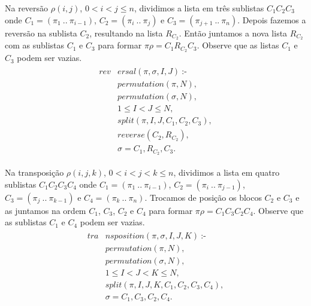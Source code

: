 Na reversão $\rho(i,j)$, $0 < i < j \leq n$, dividimos a lista em três
sublistas $C_{1}C_{2}C_{3}$ onde $C_{1} = (\pi_{1}~..~\pi_{i-1})$,
$C_{2} = (\pi_{i}~..~\pi_{j})$ e $C_{3} = (\pi_{j+1}~..~\pi_{n})$.
Depois fazemos a reversão na sublista $C_{2}$, resultando na lista
$R_{C_{2}}$. Então juntamos a nova lista $R_{C_{2}}$ com as sublistas
$C_{1}$ e $C_{3}$ para formar $\pi\rho = C_{1}R_{C_{2}}C_{3}$. Observe
que as listas $C_{1}$ e $C_{3}$ podem ser vazias.
\begin{align}
  \label{reversal}
  \begin{split}
  \textit{rev}&\textit{ersal}(\pi, \sigma, I, J)~\text{:-} \\
  &\textit{permutation}(\pi, N), \\
  &\textit{permutation}(\sigma, N),  \\
  &1 \le I < J \le N, \\
  &\textit{split}(\pi, I, J, C_{1}, C_{2}, C_{3}), \\
  &\textit{reverse}(C_{2}, R_{C_{2}}),  \\
  &\sigma = C_{1}, R_{C_{2}}, C_{3}. 
  \end{split}
\end{align}

Na transposição $\rho(i,j,k)$, $0 < i < j < k\leq n$, dividimos a lista
em quatro sublistas $C_{1}C_{2}C_{3}C_{4}$ onde $C_{1} =
(\pi_{1}~..~\pi_{i-1})$, $C_{2} = (\pi_{i}~..~\pi_{j-1})$, $C_{3} =
(\pi_{j}~..~\pi_{k-1})$ e $C_{4} = (\pi_{k}~..~\pi_{n})$. Trocamos de
posição os blocos $C_{2}$ e $C_{3}$ e as juntamos na ordem $C_{1}$,
$C_{3}$, $C_{2}$ e $C_{4}$ para formar $\pi\rho = C_{1}C_{3}C_{2}C_{4}$.
Observe que as sublistas $C_{1}$ e $C_{4}$ podem ser vazias.
\begin{align}
  \label{transposition}
  \begin{split}
  \textit{tra}&\textit{nsposition}(\pi, \sigma, I, J, K)~\text{:-} \\
  &\textit{permutation}(\pi, N), \\
  &\textit{permutation}(\sigma, N), \\
  &1 \le I < J < K \le N,  \\
  &\textit{split}(\pi, I, J, K, C_{1}, C_{2}, C_{3}, C_{4}), \\
  &\sigma = C_{1}, C_{3}, C_{2}, C_{4}. 
  \end{split}
\end{align}


